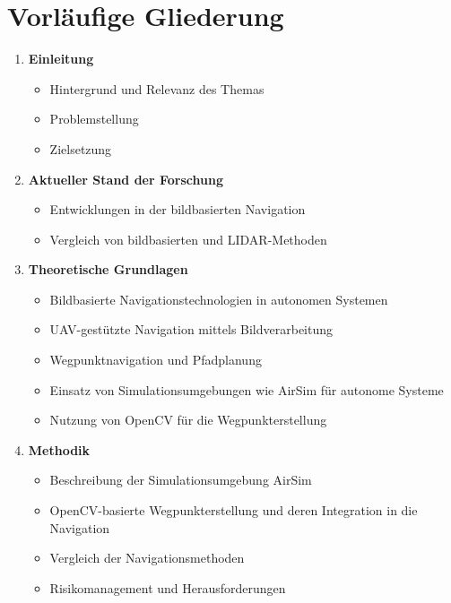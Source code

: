 \section{Vorläufige Gliederung}

\begin{enumerate}
    \item \textbf{Einleitung}
    \begin{itemize}
        \item Hintergrund und Relevanz des Themas
        \item Problemstellung
        \item Zielsetzung
    \end{itemize}
    
    \item \textbf{Aktueller Stand der Forschung}
    \begin{itemize}
        \item Entwicklungen in der bildbasierten Navigation
        \item Vergleich von bildbasierten und \gls{LIDAR}-Methoden
    \end{itemize}
    
    \item \textbf{Theoretische Grundlagen}
    \begin{itemize}
        \item Bildbasierte Navigationstechnologien in autonomen Systemen
        \item UAV-gestützte Navigation mittels Bildverarbeitung
        \item Wegpunktnavigation und Pfadplanung
        \item Einsatz von Simulationsumgebungen wie \gls{AirSim} für autonome Systeme
        \item Nutzung von \gls{OpenCV} für die Wegpunkterstellung
    \end{itemize}
    
    \item \textbf{Methodik}
    \begin{itemize}
        \item Beschreibung der Simulationsumgebung \gls{AirSim}
        \item \gls{OpenCV}-basierte Wegpunkterstellung und deren Integration in die Navigation
        \item Vergleich der Navigationsmethoden
        \item Risikomanagement und Herausforderungen
    \end{itemize}
    

\end{enumerate}
